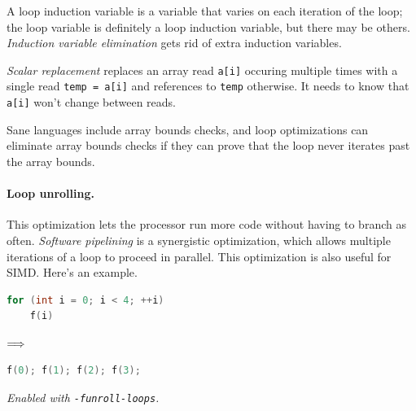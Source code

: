 \documentclass[a4paper]{report}
\begin{document}
A loop induction variable is a variable that varies on each iteration
of the loop; the loop variable is definitely a loop induction variable,
but there may be others. \emph{Induction variable elimination} gets
rid of extra induction variables.

\emph{Scalar replacement} replaces an array read {\tt a[i]}
occuring multiple times with a single read {\tt temp = a[i]} and references
to {\tt temp} otherwise. It needs to know that {\tt a[i]} won't change
between reads.

Sane languages include array bounds checks, and loop optimizations
can eliminate array bounds checks if they can prove that the loop
never iterates past the array bounds.

\paragraph{Loop unrolling.} This optimization
lets the processor run more code without having to branch
as often. \emph{Software pipelining} is a synergistic optimization,
which allows multiple iterations of a loop to proceed in parallel.
This optimization is also useful for SIMD. Here's an example.
\begin{center}
\vspace*{-1em}
\begin{minipage}{.3\textwidth}
  \begin{lstlisting}[language=C]
for (int i = 0; i < 4; ++i)
    f(i)
  \end{lstlisting}
  \end{minipage} $\Longrightarrow \hspace*{2em}$ \begin{minipage}{.4\textwidth}
  \begin{lstlisting}[language=C]
f(0); f(1); f(2); f(3);
  \end{lstlisting}
  \end{minipage}
  \end{center}
\noindent \emph{Enabled with {\tt -funroll-loops}.}
\end{document}

